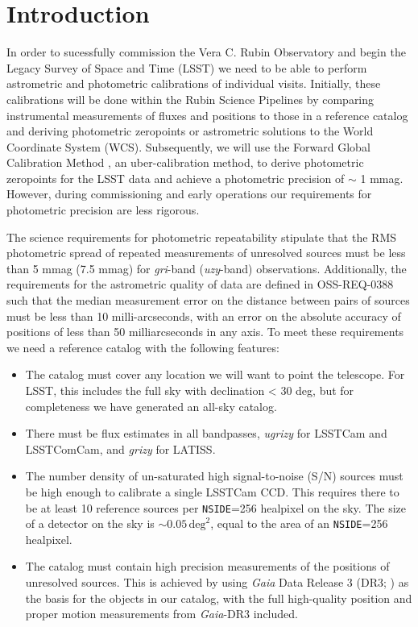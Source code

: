 \section{Introduction}
In order to sucessfully commission the Vera C. Rubin Observatory and begin the Legacy Survey of Space and Time (LSST) we need to be able to perform astrometric and photometric calibrations of individual visits.
Initially, these calibrations will be done within the Rubin Science Pipelines by comparing instrumental measurements of fluxes and positions to those in a reference catalog and deriving photometric zeropoints or astrometric solutions to the World Coordinate System (WCS).
Subsequently, we will use the Forward Global Calibration Method \citep[FGCM;][]{2018AJ....155...41B}, an uber-calibration method, to derive photometric zeropoints for the LSST data and achieve a photometric precision of $\sim$ 1 mmag.
However, during commissioning and early operations our requirements for photometric precision are less rigorous.

The science requirements for photometric repeatability \citep[OSS-REQ-0387;][]{LSE-30} stipulate that the RMS photometric spread of repeated measurements of unresolved sources must be less than 5 mmag (7.5 mmag) for \emph{gri}-band (\emph{uzy}-band) observations.
Additionally, the requirements for the astrometric quality of data are defined in OSS-REQ-0388 such that the median measurement error on the distance between pairs of sources must be less than 10 milli-arcseconds, with an error on the absolute accuracy of positions of less than 50 milliarcseconds in any axis.
To meet these requirements we need a reference catalog with the following features:

\begin{itemize}
    \item The catalog must cover any location we will want to point the telescope.
    For LSST, this includes the full sky with declination < 30 deg, but for completeness we have generated an all-sky catalog.
    \item There must be flux estimates in all bandpasses, \textit{ugrizy} for LSSTCam and LSSTComCam, and \textit{grizy} for LATISS.
    \item The number density of un-saturated high signal-to-noise (S/N) sources must be high enough to calibrate a single LSSTCam CCD.
    This requires there to be at least 10 reference sources per \texttt{NSIDE}=256 healpixel on the sky.
    The size of a detector on the sky is $\sim 0.05\,\mathrm{deg}^2$, equal to the area of an \texttt{NSIDE}=256 healpixel.
    \item The catalog must contain high precision measurements of the positions of unresolved sources.
    This is achieved by using \textit{Gaia} Data Release 3 (DR3; \citealt{GaiaCollaboration:2023}) as the basis for the objects in our catalog, with the full high-quality position and proper motion measurements from \textit{Gaia}-DR3 included.
\end{itemize}

